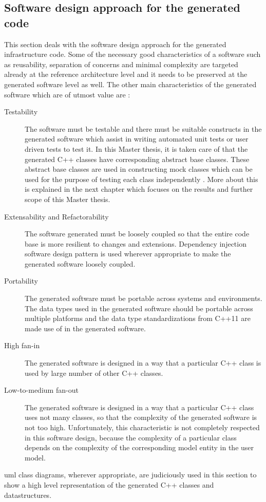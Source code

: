 \subsection{Software design approach for the generated code}
\label{subsection: Software design approach}
This section deals with the software design approach for the generated infrastructure code. Some of the necessary good characteristics of a software such as reusability, separation of concerns and minimal complexity are targeted already at the reference architecture level and it needs to be preserved at the generated software level as well. The other main characteristics of the generated software which are of utmost value are \cite{CodeComplete}:
\begin{description}
\item [Testability] The software must be testable and there must be suitable constructs in the generated software which assist in writing automated unit tests or user driven tests to test it. In this Master thesis, it is taken care of that the generated C++ classes have corresponding abstract base classes. These abstract base classes are used in constructing mock classes which can be used for the purpose of testing each class independently \cite{GoogleMock}. More about this is explained in the next chapter which focuses on the results and further scope of this Master thesis.
\item [Extensability and Refactorability] The software generated must be loosely coupled so that the entire code base is more resilient to changes and extensions. Dependency injection software design pattern \cite{InvOfCntrlurl} is used wherever appropriate to make the generated software loosely coupled.
\item [Portability] The generated software must be portable across systems and environments. The data  types used in the generated software should be portable across multiple platforms and the data type standardizations from C++11 are made use of in the generated software.
\item [High fan-in] The generated software is designed in a way that a particular C++ class is used by large number of other C++ classes.
\item [Low-to-medium fan-out] The generated software is designed in a way that a particular C++ class uses not many classes, so that the complexity of the generated software is not too high. Unfortunately, this characteristic is not completely respected in this software design, because the complexity of a particular class depends on the complexity of the corresponding model entity in the user model.      
\end{description}
\ac{uml} class diagrams, wherever appropriate, are judiciously used in this section to show a high level representation of the generated C++ classes and datastructures. 

